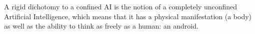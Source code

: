 A rigid dichotomy to a confined AI is the notion of a completely unconfined Artificial Intelligence, which means that it has a physical manifestation (a body) as well as the ability to think as freely as a human: an android.